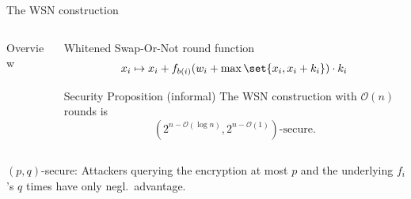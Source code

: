 \begin{frame}{The WSN construction}
\begin{columns}
\begin{column}{0.49\textwidth}
\begin{block}{Overview\vpPp}
                \vspace*{13pt}
            \end{block}
        \end{column}
        \begin{column}{0.49\textwidth}
            \begin{block}{Whitened Swap-Or-Not round function}
                \vspace*{-10pt}
                \begin{equation*}
                    x_i \mapsto x_i + f_{b(i)}(w_i + \max \set{x_i, x_i + k_i}) \cdot k_i
                \end{equation*}
            \end{block}

            \begin{block}{Security Proposition (informal)}
                The WSN construction with $\mathcal{O}(n)$ rounds is
                \begin{equation*}
                    (2^{n-\mathcal{O}(\log n)}, 2^{n-\mathcal{O}(1)})\text{-secure}.
                \end{equation*}
            \end{block}
        \end{column}
    \end{columns}
    \begingroup
        \vspace{10pt}
        \footnotesize
        $(p, q)$-secure: Attackers querying the encryption at most $p$ and the underlying $f_i$'s $q$ times have only negl.\ advantage.
    \endgroup
\end{frame}

